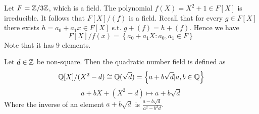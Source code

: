 \begin{example}
  Let $F=\mathbb Z/3\mathbb Z$, which is a field. The polynomial $f(X)=X^2+1\in F[X]$ is
  irreducible. It follows that $F[X]/(f)$ is a field. Recall that for every $g\in F[X]$
  there exists $h=a_0+a_1x\in F[X]$ s.t. $g+(f)=h+(f)$. Hence we have
  \[F[X]/f(x) = \left\{ a_0+a_1X : a_0,a_1\in F \right\}\]
  Note that it has 9 elements.
\end{example}

\begin{example}
  Let $d\in \mathbb Z$ be non-square. Then the quadratic number field is defined as
  \[\mathbb Q[X]/(X^2-d) \cong \mathbb Q(\sqrt{d})=\left\{ a+b\sqrt{d} | a,b\in \mathbb Q \right\}\]
  \[a+bX+(X^2-d) \mapsto a+b\sqrt{d}\]
  Where the inverse of an element $a+b\sqrt{d}$ is $\frac{a-b\sqrt{d}}{a^2-b^2d}$.
\end{example}
